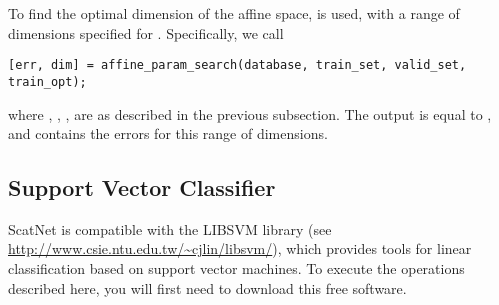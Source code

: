 \documentclass{article}
\begin{document}
To find the optimal dimension of the affine space,  is used, with a range of dimensions specified for . Specifically, we call
\begin{lstlisting}
[err, dim] = affine_param_search(database, train_set, valid_set, train_opt);
\end{lstlisting}
where , , ,  are as described in the previous subsection. The output  is equal to , and  contains the errors for this range of dimensions.

\subsection{Support Vector Classifier}
ScatNet is compatible with the LIBSVM library (see \url{http://www.csie.ntu.edu.tw/~cjlin/libsvm/}), which provides tools for linear classification based on support vector machines. To execute the operations described here, you will first need to download this free software.
\end{document}

